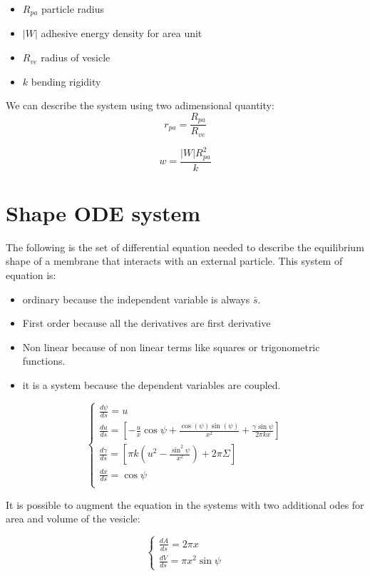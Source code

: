 \documentclass[12pt]{article}
\begin{document}
\begin{itemize}
  \item $R_{pa}$ particle radius
  \item $|W|$ adhesive energy density for area unit
  \item $R_{ve}$ radius of vesicle
  \item $k$ bending rigidity
\end{itemize}

We can describe the system using two adimensional quantity:
$$
r_{pa} = \frac{R_{pa}}{R_{ve}}
$$

$$
w = \frac{|W| R_{pa}^2}{k}
$$

\section{Shape ODE system}
The following is the set of differential equation needed to describe the equilibrium shape of a membrane that interacts with an external particle. This system of equation is:
\begin{itemize}
    \item ordinary because the independent variable is always $\bar{s}$.
    \item First order because all the derivatives are first derivative
    \item Non linear because of non linear terms like squares or trigonometric functions.
    \item it is a system because the dependent variables are coupled.
\end{itemize}


\begin{equation}
  \begin{cases} 
    \frac{d\psi}{ds} =  u \\[3mm]
    \frac{du}{ds} =  [-\frac{u}{x}\cos\psi+\frac{\cos(\psi)\sin(\psi)}{x^2}+\frac{\gamma\sin \psi}{2\pi k x}] \\[3mm]
    \frac{d\gamma}{ds} =  [\pi k (u^2-\frac{\sin^2 \psi}{x^2})+2 \pi \Sigma] \\[3mm]
    \frac{dx}{ds} =  \cos \psi \\[3mm]
  \end{cases}
\end{equation}


It is possible to augment the equation in the systems with two additional odes for area and volume of the vesicle:

\begin{equation}
  \begin{cases}
    \frac{dA}{ds} =  2 \pi x \\[3mm]
    \frac{dV}{ds} = \pi x^2 \sin{\psi}
  \end{cases}
\end{equation}
\end{document}

